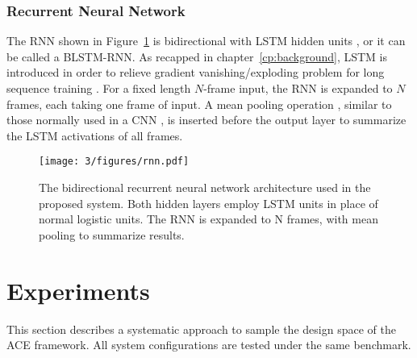 \subsubsection{Recurrent Neural Network}

The RNN shown in Figure~\ref{fig:3-rnn} is bidirectional with LSTM hidden units \cite{hochreiter1997long}, or it can be called a BLSTM-RNN. As recapped in chapter~\ref{cp:background}, LSTM is introduced in order to relieve gradient vanishing/exploding problem for long sequence training \cite{bengio2009learning}. For a fixed length $N$-frame input, the RNN is expanded to $N$ frames, each taking one frame of input. A mean pooling operation \cite{maas2011learning}, similar to those normally used in a CNN \cite{lecun1995convolutional}, is inserted before the output layer to summarize the LSTM activations of all frames.
\begin{figure}[h]
\centering
\texttt{[image: 3/figures/rnn.pdf]}
\caption{The bidirectional recurrent neural network architecture used in the proposed system. Both hidden layers employ LSTM units in place of normal logistic units. The RNN is expanded to N frames, with mean pooling to summarize results.}
\label{fig:3-rnn}
\end{figure}

\section{Experiments} \label{sec:3-exper}
This section describes a systematic approach to sample the design space of the ACE framework. All system configurations are tested under the same benchmark. %

